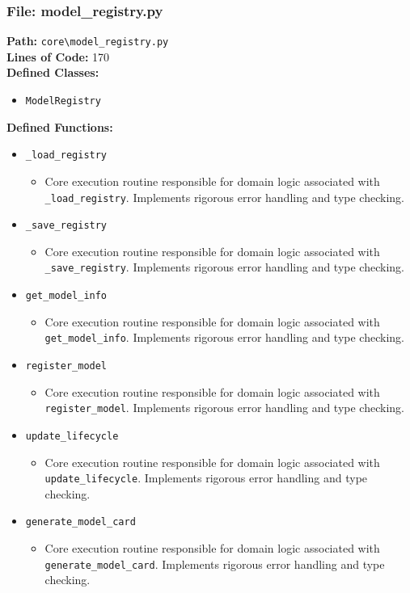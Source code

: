 \documentclass[10pt,journal,compsoc]{IEEEtran}
\begin{document}
\subsubsection{File: model\_registry.py}
\textbf{Path:} \texttt{core\textbackslash{}model\_registry.py} \\
\textbf{Lines of Code:} 170 \\
\textbf{Defined Classes:}
\begin{itemize}
    \item \texttt{ModelRegistry}
\end{itemize}
\textbf{Defined Functions:}
\begin{itemize}
    \item \texttt{\_load\_registry}
    \begin{itemize} \item Core execution routine responsible for domain logic associated with \texttt{\_load\_registry}. Implements rigorous error handling and type checking. \end{itemize}
    \item \texttt{\_save\_registry}
    \begin{itemize} \item Core execution routine responsible for domain logic associated with \texttt{\_save\_registry}. Implements rigorous error handling and type checking. \end{itemize}
    \item \texttt{get\_model\_info}
    \begin{itemize} \item Core execution routine responsible for domain logic associated with \texttt{get\_model\_info}. Implements rigorous error handling and type checking. \end{itemize}
    \item \texttt{register\_model}
    \begin{itemize} \item Core execution routine responsible for domain logic associated with \texttt{register\_model}. Implements rigorous error handling and type checking. \end{itemize}
    \item \texttt{update\_lifecycle}
    \begin{itemize} \item Core execution routine responsible for domain logic associated with \texttt{update\_lifecycle}. Implements rigorous error handling and type checking. \end{itemize}
    \item \texttt{generate\_model\_card}
    \begin{itemize} \item Core execution routine responsible for domain logic associated with \texttt{generate\_model\_card}. Implements rigorous error handling and type checking. \end{itemize}
\end{itemize}
\end{document}
